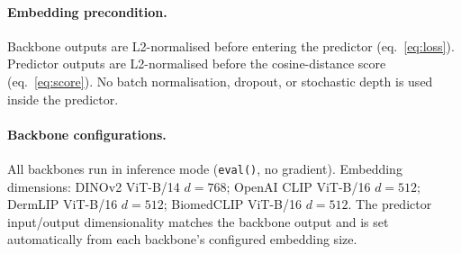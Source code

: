 \paragraph{Embedding precondition.} Backbone outputs are L2-normalised
before entering the predictor (eq.~\ref{eq:loss}). Predictor outputs are
L2-normalised before the cosine-distance score
(eq.~\ref{eq:score}). No batch normalisation, dropout, or stochastic
depth is used inside the predictor.

\paragraph{Backbone configurations.} All backbones run in inference mode
(\texttt{eval()}, no gradient). Embedding dimensions: DINOv2 ViT-B/14
$d = 768$; OpenAI CLIP ViT-B/16 $d = 512$; DermLIP ViT-B/16 $d = 512$;
BiomedCLIP ViT-B/16 $d = 512$. The predictor input/output dimensionality
matches the backbone output and is set automatically from each backbone's
configured embedding size.
